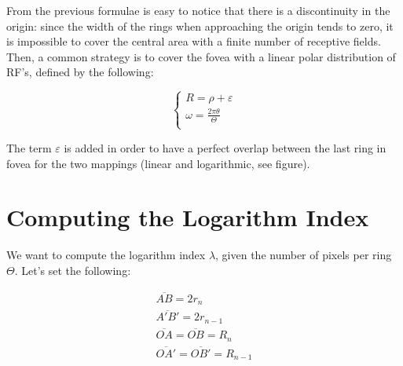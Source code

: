 \documentclass{article}
\begin{document}
From the previous formulae is easy to notice that there is a discontinuity in the origin: since the width of the rings when approaching the origin tends to zero, it is impossible to cover the central area with a finite number of receptive fields. 
Then, a common strategy is to cover the fovea with a linear polar distribution of RF's, defined by the following:

\begin{equation}
	\begin{cases}
	R = \rho +\varepsilon\\
	\omega = \frac{2\pi\theta }{\Theta} \\
	\end{cases}
\end{equation}

The term $\varepsilon$ is added in order to have a perfect overlap between the last ring in fovea for the two mappings (linear and logarithmic, see figure).


	
\section{Computing the Logarithm Index}
\label{sec:ComputingTheLogarithmIndex}

	We want to compute the logarithm index $\lambda$, given the number of pixels per ring $\Theta$. Let's set the following:
	
\begin{eqnarray}
	\overline{AB}=2r_{n}\\
	\overline{A'B'}=2r_{n-1}\\
	\overline{OA}=\overline{OB}=R_{n}\\
	\overline{OA'}=\overline{OB'}=R_{n-1}
\end{eqnarray}
\end{document}
